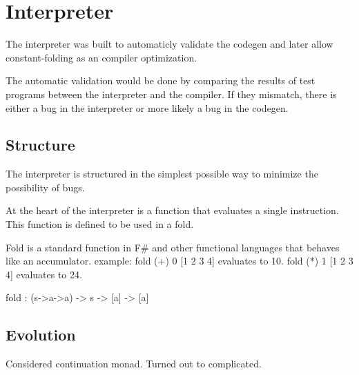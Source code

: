 \section{Interpreter}
The interpreter was built to automaticly validate the codegen and later allow constant-folding as an compiler optimization.

The automatic validation would be done by comparing the results of test programs between the interpreter and the compiler.
If they mismatch, there is either a bug in the interpreter or more likely a bug in the codegen.

\subsection{Structure}
The interpreter is structured in the simplest possible way to minimize the possibility of bugs.

At the heart of the interpreter is a function that evaluates a single instruction.
This function is defined to be used in a fold.

Fold is a standard function in F\# and other functional languages that behaves like an accumulator.
example: fold (+) 0 [1 2 3 4] evaluates to 10.
fold (*) 1 [1 2 3 4] evaluates to 24.

\begin{code}
    fold : (s->a->a) -> s -> [a] -> [a]
\end{code}

\subsection{Evolution}
Considered continuation monad.
Turned out to complicated.
